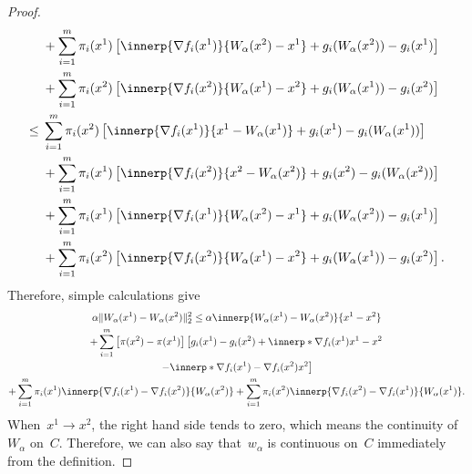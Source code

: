 \documentclass[../../main]{subfiles}
\begin{document}
\begin{proof}
\begin{align}
                         &+ \sum_{i = 1}^{m} \pi_i(x^1) \left[ \innerp{\nabla f_i(x^1)}{W_\alpha(x^2) - x^1} + g_i(W_\alpha(x^2)) - g_i(x^1) \right] \\
                         &+ \sum_{i = 1}^{m} \pi_i(x^2) \left[ \innerp{\nabla f_i(x^2)}{W_\alpha(x^1) - x^2} + g_i(W_\alpha(x^1)) - g_i(x^2) \right] \\
                    \le{}& \sum_{i = 1}^{m} \pi_i(x^2) \left[ \innerp{\nabla f_i(x^1)}{x^1 - W_\alpha(x^1)} + g_i(x^1) - g_i(W_\alpha(x^1)) \right] \\
                         &+ \sum_{i = 1}^{m} \pi_i(x^1) \left[ \innerp{\nabla f_i(x^2)}{x^2 - W_\alpha(x^2)} + g_i(x^2) - g_i(W_\alpha(x^2)) \right] \\
                         &+ \sum_{i = 1}^{m} \pi_i(x^1) \left[ \innerp{\nabla f_i(x^1)}{W_\alpha(x^2) - x^1} + g_i(W_\alpha(x^2)) - g_i(x^1) \right] \\
                         &+ \sum_{i = 1}^{m} \pi_i(x^2) \left[ \innerp{\nabla f_i(x^2)}{W_\alpha(x^1) - x^2} + g_i(W_\alpha(x^1)) - g_i(x^2) \right]
                .\end{align}
                Therefore, simple calculations give
                \begin{multline} \label{eq:cont_w_alpha:cont}
                    \alpha \norm{W_\alpha(x^1) - W_\alpha(x^2)}_2^2 \le \alpha \innerp{W_\alpha(x^1) - W_\alpha(x^2)}{x^1 - x^2} \\
                    + \sum_{i = 1}^{m} \left[ \pi(x^2) - \pi(x^1) \right] \left[ g_i(x^1) - g_i(x^2) + \innerp*{\nabla f_i(x^1)}{x^1 - x^2} \right. \\
                \left. - \innerp*{\nabla f_i(x^1) - \nabla f_i(x^2)}{x^2} \right] \\
                        + \sum_{i = 1}^{m} \pi_i(x^1) \innerp{\nabla f_i(x^1) - \nabla f_i(x^2)}{W_\alpha(x^2)}
                        + \sum_{i = 1}^{m} \pi_i(x^2) \innerp{\nabla f_i(x^2) - \nabla f_i(x^1)}{W_\alpha(x^1)}
                .\end{multline}
               When~$x^1 \to x^2$, the right hand side tends to zero, which means the continuity of~$W_\alpha$ on~$C$.
               Therefore, we can also say that~$w_\alpha$ is continuous on~$C$ immediately from the definition.


\end{proof}
\end{document}
